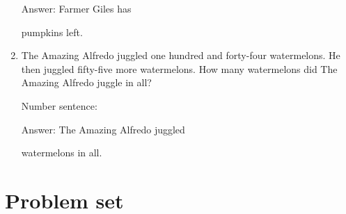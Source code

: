 \documentclass{tufte-book}
\begin{document}
\begin{enumerate}
  Answer: Farmer Giles has
  \dotfill\medskip\par\mbox{}\dotfill\medskip\par\mbox{}\dotfill\bigskip
  pumpkins left.
\item
  The Amazing Alfredo juggled one hundred and forty-four watermelons. He
  then juggled fifty-five more watermelons. How many watermelons did The
  Amazing Alfredo juggle in all?\medskip\par
  Number sentence:
  \dotfill\medskip\par
  Answer: The Amazing Alfredo juggled
  \dotfill\medskip\par\mbox{}\dotfill\medskip\par\mbox{}\dotfill\bigskip
  watermelons in all.
\end{enumerate}



\clearpage\section{Problem set }
\end{document}
